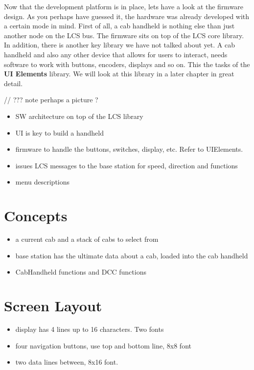 
Now that the development platform is in place, lets have a look at the firmware design. As you perhaps have guessed it, the hardware was already developed with a certain mode in mind. First of all, a cab handheld is nothing else than just another node on the LCS bus. The firmware sits on top of the LCS core library. In addition, there is another key library we have not talked about yet. A cab handheld and also any other device that allows for users to interact, needs software to work with buttons, encoders, displays and so on. This the tasks of the \textbf{UI Elements } library. We will look at this library in a later chapter in great detail.

// ??? note perhaps a picture ?
\begin{itemize}
\begin{itemize}
\item SW architecture on top of the LCS library
\item UI is key to build a handheld
\item firmware to handle the buttons, switches, display, etc. Refer to UIElements.
\item issues LCS messages to the base station for speed, direction and functions
\item menu descriptions
\end{itemize}
\end{itemize}

\section{Concepts}
\begin{itemize}
\begin{itemize}
\item a current cab and a stack of cabs to select from
\item base station has the ultimate data about a cab, loaded into the cab handheld
\item CabHandheld functions and DCC functions
\end{itemize}
\end{itemize}

\section{Screen Layout}
\begin{itemize}
\begin{itemize}
\item display has 4 lines up to 16 characters. Two fonts
\item four navigation buttons, use top and bottom line, 8x8 font
\item two data lines between, 8x16 font.
\end{itemize}
\end{itemize}

